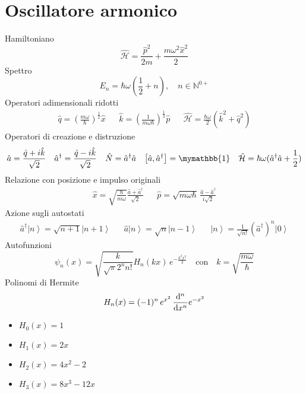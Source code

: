 \documentclass{article}
\newcommand{\deh}{\mathrm{d}}
\newcommand{\ham}{\hat{\mathcal{H}}}
\newcommand{\dsone}{\mymathbb{1}}
\newcommand{\onehalf}{\frac{1}{2}}
\newcommand{\ket}[1]{\left| #1 \right\rangle}
\newcommand{\der}[2][1]{\if 1#1 \frac{\deh}{\deh #2} \else \frac{\deh^#1}{\deh #2^#1} \fi}
\newcommand{\comm}[2]{\left[#1,#2\right]}
\begin{document}
\section{Oscillatore armonico}
Hamiltoniano
\[ \ham = \frac{\hat{p}^2}{2m} + \frac{m\omega^2 \hat{x}^2}{2} \]
Spettro
\[ E_n=\hbar\omega\left(\frac{1}{2}+n\right),\quad n \in \mathbb{N}^{0+} \]
Operatori adimensionali ridotti
\begin{align*}
    \hat{q}=\left(\frac{m\omega}{\hbar}\right)^{\onehalf}\hat{x} && \hat{k}=\left(\frac{1}{m\omega\hbar}\right)^{\onehalf} \hat{p} && \ham = \frac{\hbar\omega}{2}(\hat{k}^2+\hat{q}^2)
\end{align*}
Operatori di creazione e distruzione
\begin{align*}
    \hat{a}=\frac{\hat{q}+i\hat{k}}{\sqrt{2}} && \hat{a}^\dagger=\frac{\hat{q}-i\hat{k}}{\sqrt{2}} && \hat{N}=\hat{a}^\dagger \hat{a} && \comm{\hat{a}}{\hat{a}^\dagger}=\dsone && \ham = \hbar\omega(\hat{a}^\dagger\hat{a}+\frac{1}{2})
\end{align*}
Relazione con posizione e impulso originali
\begin{align*}
    \hat{x}=\sqrt{\frac{\hbar}{m\omega}}\frac{\hat{a}+\hat{a}^\dagger}{\sqrt{2}} && \hat{p}=\sqrt{m\omega\hbar}\,\frac{\hat{a}-\hat{a}^\dagger}{i\sqrt{2}}
\end{align*}
Azione sugli autostati
\begin{align*}
\hat{a}^\dagger\ket{n}=\sqrt{n+1}\ket{n+1} && \hat{a}\ket{n}=\sqrt{n}\ket{n-1} && \ket{n}=\frac{1}{\sqrt{n!}}\left(\hat{a}^\dagger\right)^n\ket{0}
\end{align*}
Autofunzioni
\[\psi_n(x)=\sqrt{\frac{k}{\sqrt{\pi}2^n n!}}H_n(kx)\,e^{-\frac{k^2x^2}{2}}\quad\mathrm{con}\quad k=\sqrt{\frac{m\omega}{\hbar}}\]
Polinomi di Hermite
\[H_n(x)=(-1)^n \, e^{x^2}\,\der[n]{x}e^{-x^2}\]
\begin{itemize}
    \item[] $H_0(x)=1$
    \item[] $H_1(x)=2x$
    \item[] $H_2(x)=4x^2-2$
    \item[] $H_3(x)=8x^3-12x$
\end{itemize}
\end{document}
